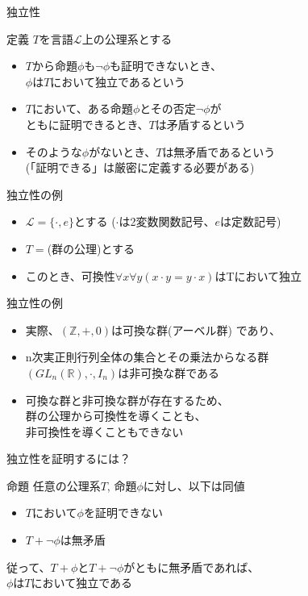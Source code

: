 \documentclass[17pt,aspectratio=169]{beamer}
\begin{document}
\begin{frame} {独立性}
    \begin{block}{定義}
        $T$を言語$\mathcal{L}$上の公理系とする
        \begin{itemize}
            \item $T$から命題$\phi$も$\neg \phi$も証明できないとき、\\ $\phi$は$T$において独立であるという
            \item $T$において、ある命題$\phi$とその否定$\neg \phi$が\\ともに証明できるとき、$T$は矛盾するという
            \item そのような$\phi$がないとき、$T$は無矛盾であるという \\ {\footnotesize (「証明できる」は厳密に定義する必要がある)}
        \end{itemize}
    \end{block}

\end{frame}

\begin{frame} {独立性の例}
    \begin{itemize}
        \item $\mathcal{L} = \{ \cdot, e \}$とする {\small ($\cdot$は2変数関数記号、$e$は定数記号)}
        \item $T = $(群の公理)とする
        \item このとき、可換性$\forall x \forall y (x\cdot y = y \cdot x)$はTにおいて独立
    \end{itemize}
\end{frame}

\begin{frame} {独立性の例}
    \begin{itemize}
        \item 実際、$(\mathbb{Z}, +, 0)$は可換な群{\small (アーベル群) }であり、
        \item n次実正則行列全体の集合とその乗法からなる群 \\$(GL_n(\mathbb{R}), \cdot, I_n)$は非可換な群である
        \item 可換な群と非可換な群が存在するため、\\群の公理から可換性を導くことも、\\非可換性を導くこともできない
    \end{itemize}
\end{frame}

\begin{frame} {独立性を証明するには？}
    \begin{exampleblock}{命題}
        任意の公理系$T$, 命題$\phi$に対し、以下は同値
        \begin{itemize}
            \item $T$において$\phi$を証明できない
            \item $T + \neg \phi$は無矛盾
        \end{itemize}
    \end{exampleblock}
    従って、$T + \phi$と$T + \neg \phi$がともに無矛盾であれば、\\$\phi$は$T$において独立である
\end{frame}
\end{document}
